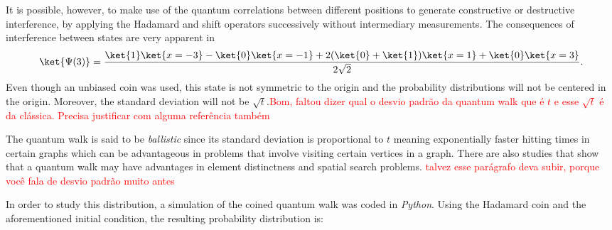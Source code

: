                 It is possible, however, to make use of the quantum correlations between different positions to generate constructive or destructive  interference, by applying the Hadamard and shift operators successively without intermediary measurements.
                The consequences of interference between states are very apparent in
                \begin{equation}
                    \ket{\Psi(3)} = \frac{\ket{1}\ket{x=-3}-\ket{0}\ket{x=-1}+2(\ket{0}+\ket{1})\ket{x=1}+\ket{0}\ket{x=3}}{2\sqrt{2}}\label{eq:12}.
                \end{equation}
                Even though an unbiased coin was used, this state is not symmetric to the origin and the probability distributions will not be centered in the origin. Moreover, the standard deviation will not be $\sqrt{t}$.\textcolor{red}{Bom, faltou dizer qual o desvio padrão da quantum walk que é $t$ e esse $\sqrt{t}$ é da clássica. Precisa justificar com alguma referência também}\par
                The quantum walk is said to be \textit{ballistic} since its standard deviation is proportional to $t$ \cite{andraca2012} meaning exponentially faster hitting times in certain graphs \cite{childs2002,fahri98} which can be advantageous in problems that involve visiting certain vertices in a graph. There are also studies that show that a quantum walk may have advantages in element distinctness \cite{ambainis2003} and spatial search \cite{childs2004} problems. \textcolor{red}{talvez esse parágrafo deva subir, porque você fala de desvio padrão muito antes}
                
    	        In order to study this distribution, a simulation of the coined quantum walk was coded in \textit{Python}. Using the Hadamard coin and the aforementioned initial condition, the resulting probability distribution is:
    	        
